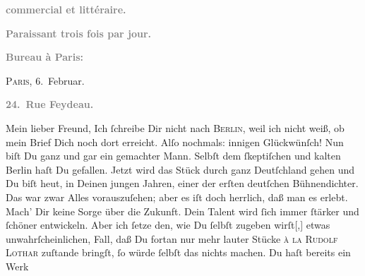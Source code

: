 \begin{ledgroupsized}[t]{13cm}
           \pstart
           \begin{otherlanguage}{french}\textcolor{gray}{\textbf{commercial et littéraire.}}\end{otherlanguage}\pend
           \pstart
           \begin{otherlanguage}{french}\textcolor{gray}{\textbf{\textbf{Paraissant trois fois par jour.}}}\end{otherlanguage}\pend
           \pstart
           \begin{otherlanguage}{french}\textcolor{gray}{\textbf{\textbf{Bureau à Paris:}}}\end{otherlanguage}\hfill \textsc{Paris}, 6. Februar.\pend
           \pstart
           \begin{otherlanguage}{french}\textcolor{gray}{\textbf{\textbf{24. Rue Feydeau.}}}\end{otherlanguage}\pend
           \pstart\center{}Mein lieber Freund,\pend\pstart
           Ich ſchreibe Dir nicht nach \textsc{Berlin}, weil ich nicht weiß, ob mein Brief Dich noch dort erreicht.\pend
           \pstart
           Alſo nochmals: innigen Glückwünſch! Nun biſt Du ganz und gar ein gemachter Mann.
               Selbſt dem ſkeptiſchen und kalten Berlin haſt Du
               gefallen. Jetzt wird das Stück
               durch ganz Deutſchland gehen\strikeout{,} und Du biſt heut, in Deinen jungen Jahren, einer der
               erſten deutſchen Bühnendichter. {\pb}Das war zwar Alles
               vorauszuſehen; aber es iſt doch herrlich, daß man es  erleb\strikeout{\textcolor{gray}{e}}t. Mach’ Dir keine Sorge über die Zukunft. Dein Talent wird ſich immer ſtärker
               und ſchöner entwickeln. Aber ich ſetze den, wie Du ſelbſt zugeben
                  wirſt{[},{]} etwas unwahrſcheinlichen, Fall, daß  Du fortan nur mehr lauter Stücke \textsc{à la}{ }\textsc{Rudolf Lothar} zuſtande bringſt, ſo würde ſelbſt das nichts machen. Du haſt bereits ein Werk

\end{ledgroupsized}

